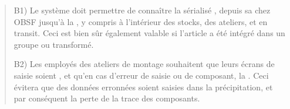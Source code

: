 \documentclass[letterpaper,10pt,french]{sphinxmanual}
\begin{document}
\begin{quote}
\begin{itemize}
\begin{description}
\begin{itemize}
\end{itemize}

\end{description}

\end{itemize}

B1) Le système doit permettre de connaître la  sérialisé , depuis sa  chez OBSF jusqu’à la , y compris à l’intérieur des stocks, des ateliers, et en transit. Ceci est bien sûr également valable si l’article a été intégré dans un groupe ou transformé.

B2) Les employés des ateliers de montage souhaitent que leurs écrans de saisie soient , et qu’en cas d’erreur de saisie ou de composant, la . Ceci évitera que des données erronnées soient saisies dans la précipitation, et par conséquent la perte de la trace des composants.
\end{quote}
\end{document}
